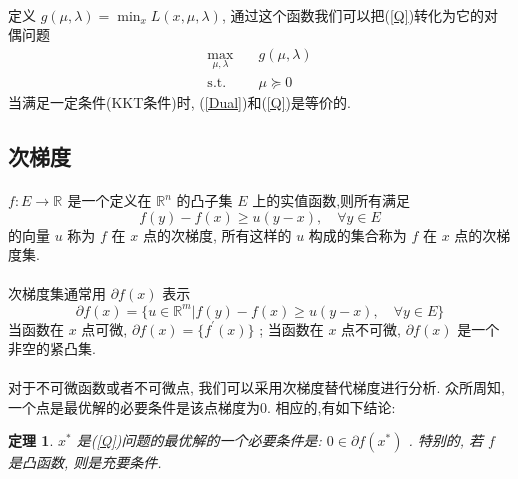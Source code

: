 \documentclass[a4paper, UTF8]{ctexart}				%
\newtheorem{theo}{\bf 定理}[section]			  %
\numberwithin{equation}{section}				%
\newcommand{\upcite}[1]{\textsuperscript{\textsuperscript{\cite{#1}}}}
\begin{document}
			\paragraph{}
				\quad 定义 $g(\mu, \lambda) = \min_x L(x, \mu, \lambda)$, 通过这个函数我们可以把(\ref{Q})转化为它的对偶问题\upcite{yuan2008nonliner}
				\begin{equation}
					\begin{split}\label{Dual}
						\max_{\mu, \lambda} \quad
							& g(\mu,\lambda)\\
						\text{s.t.} \quad
							& \mu \succeq 0
					\end{split}
				\end{equation}
				当满足一定条件(KKT条件)时, (\ref{Dual})和(\ref{Q})是等价的.

		\subsection{次梯度}
			\paragraph{}
				\quad $f: E \rightarrow \mathbb{R}^{}$ 是一个定义在 $\mathbb{R}^{n}$ 的凸子集 $E$ 上的实值函数,则所有满足
				\begin{equation}
					f(y) - f(x) \geq u(y-x), \quad \forall y \in E
				\end{equation}
				的向量 $u$ 称为 $f$ 在 $x$ 点的次梯度, 所有这样的 $u$ 构成的集合称为 $f$ 在 $x$ 点的次梯度集.\upcite{yuan2008nonliner}

			\paragraph{}
				\quad 次梯度集通常用 $\partial f(x)$ 表示
				\begin{equation}
						\partial f(x)
					=	\{u \in \mathbb{R}^{m} \vert f(y) - f(x) \geq u(y - x), \quad \forall y \in E\}
				\end{equation}
				当函数在 $x$ 点可微, $\partial f(x) = \{f^\prime(x)\}$ ; 当函数在 $x$ 点不可微, $\partial f(x)$ 是一个非空的紧凸集.

			\paragraph{}
				\quad 对于不可微函数或者不可微点, 我们可以采用次梯度替代梯度进行分析. 众所周知, 一个点是最优解的必要条件是该点梯度为0. 相应的,有如下结论:
			\begin{theo}
				$x^*$ 是(\ref{Q})问题的最优解的一个必要条件是: $0 \in \partial f(x^*)$ . 特别的, 若 $f$ 是凸函数, 则是充要条件.
			\end{theo}
\end{document}
